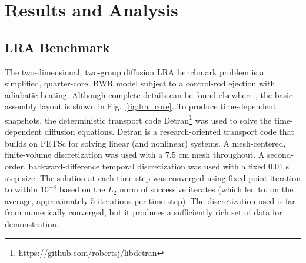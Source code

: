 \documentclass{anstrans}
\begin{document}
\section{Results and Analysis}
\label{sec:application}

\subsection{LRA Benchmark}

The two-dimensional, two-group diffusion LRA benchmark problem is a simplified, quarter-core, BWR model subject to a control-rod ejection with adiabatic heating.
Although complete details can be found elsewhere \cite{anl}, the basic assembly layout is shown in Fig.~\ref{fig:lra_core}.
To produce time-dependent snapshots, the deterministic transport code Detran\footnote{https://github.com/robertsj/libdetran} was used to solve the time-dependent diffusion equations.
Detran is a research-oriented transport code that builds on PETSc\cite{petsc} for solving linear (and nonlinear) systems.  
A mesh-centered, finite-volume discretization was used with a 7.5 cm mesh throughout.
A second-order, backward-difference temporal discretization was used with a fixed 0.01 s step size.  
The solution at each time step was converged using fixed-point iteration to within $10^{-8}$ based on the $L_2$ norm of successive iterates (which led to, on the average, approximately 5 iterations per time step).
The discretization used is far from numerically converged, but it produces a sufficiently rich set of data for demonstration.
\end{document}
